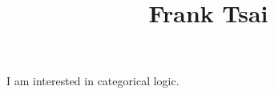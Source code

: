 \documentclass[a4paper]{article}
\title{Frank Tsai}
\begin{document}
\maketitle
\par{I am interested in categorical logic.}
\printbibliography
\end{document}

